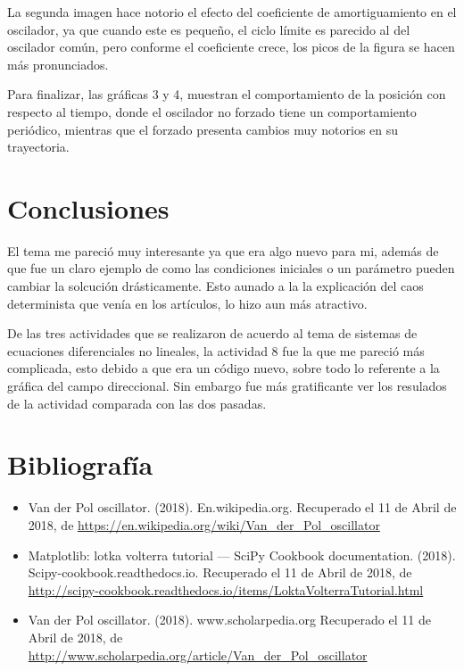 \documentclass{article}
\begin{document}
La segunda imagen hace notorio el efecto del coeficiente de amortiguamiento en el oscilador, ya que cuando este es pequeño, el ciclo límite es parecido al del oscilador común, pero conforme el coeficiente crece, los picos de la figura se hacen más pronunciados.

Para finalizar, las gráficas 3 y 4, muestran el comportamiento de la posición con respecto al tiempo, donde el oscilador no forzado tiene un comportamiento periódico, mientras que el forzado presenta cambios muy notorios en su trayectoria.

\section{Conclusiones}
El tema me pareció muy interesante ya que era algo nuevo para mi, además de que fue un claro ejemplo de como las condiciones iniciales o un parámetro pueden cambiar la solcución drásticamente. Esto aunado a la la explicación del caos determinista que venía en los artículos, lo hizo aun más atractivo.

De las tres actividades que se realizaron de acuerdo al tema de sistemas de ecuaciones diferenciales no lineales, la actividad 8 fue la que me pareció más complicada, esto debido a que era un código nuevo, sobre todo lo referente a la gráfica del campo direccional. Sin embargo fue más gratificante ver los resulados de la actividad comparada con las dos pasadas.

\section{Bibliografía}
\begin{itemize}
\item Van der Pol oscillator. (2018). En.wikipedia.org. Recuperado el 11 de Abril de 2018, de \url{https://en.wikipedia.org/wiki/Van_der_Pol_oscillator}
\item Matplotlib: lotka volterra tutorial — SciPy Cookbook documentation. (2018). Scipy-cookbook.readthedocs.io. Recuperado el 11 de Abril de 2018, de \url{http://scipy-cookbook.readthedocs.io/items/LoktaVolterraTutorial.html}
\item Van der Pol oscillator. (2018). www.scholarpedia.org Recuperado el 11 de Abril de 2018, de \url{http://www.scholarpedia.org/article/Van_der_Pol_oscillator}
\end{itemize}
\end{document}
